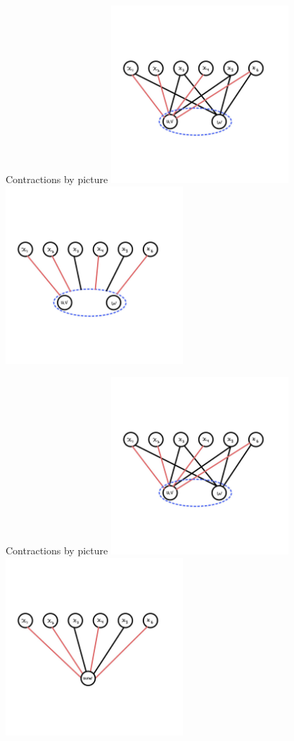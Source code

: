 \documentclass[aspectratio=169]{beamer}
\begin{document}
\begin{frame}{Contractions by picture}
    \includegraphics[width=0.5\textwidth]{images/cropped-08.jpg}%
    \includegraphics[width=0.5\textwidth]{images/cropped-11.jpg}
\end{frame}

\begin{frame}{Contractions by picture}
    \includegraphics[width=0.5\textwidth]{images/cropped-08.jpg}%
    \includegraphics[width=0.5\textwidth]{images/cropped-12.jpg}
\end{frame}
\end{document}
